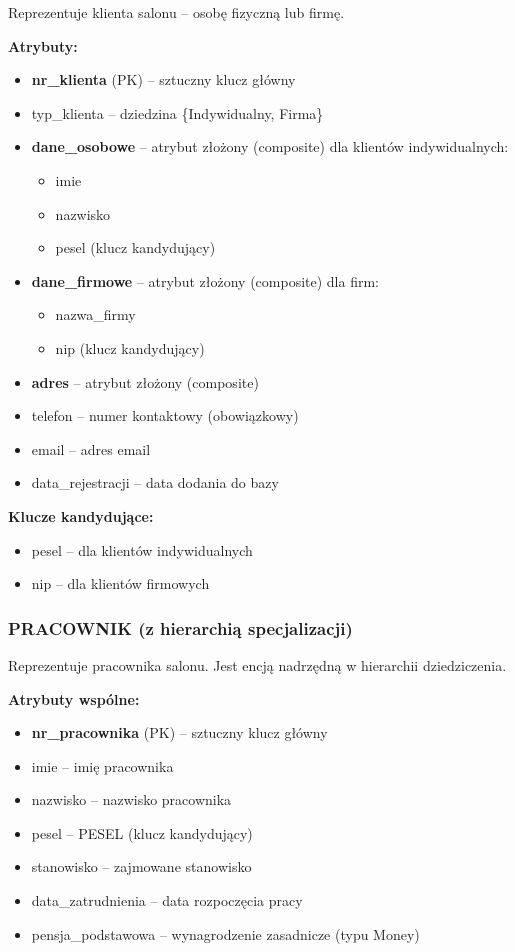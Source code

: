 \documentclass[a4paper,titleauthor]{mwart}
\begin{document}
	Reprezentuje klienta salonu -- osobę fizyczną lub firmę.
	
	\textbf{Atrybuty:}
	\begin{itemize}
		\item \textbf{nr\_klienta} (PK) -- sztuczny klucz główny
		\item typ\_klienta -- dziedzina \{Indywidualny, Firma\}
		\item \textbf{dane\_osobowe} -- atrybut złożony (composite) dla klientów indywidualnych:
		\begin{itemize}
			\item imie
			\item nazwisko
			\item pesel (klucz kandydujący)
		\end{itemize}
		\item \textbf{dane\_firmowe} -- atrybut złożony (composite) dla firm:
		\begin{itemize}
			\item nazwa\_firmy
			\item nip (klucz kandydujący)
		\end{itemize}
		\item \textbf{adres} -- atrybut złożony (composite)
		\item telefon -- numer kontaktowy (obowiązkowy)
		\item email -- adres email
		\item data\_rejestracji -- data dodania do bazy
	\end{itemize}
	
	\textbf{Klucze kandydujące:}
	\begin{itemize}
		\item pesel -- dla klientów indywidualnych
		\item nip -- dla klientów firmowych
	\end{itemize}
	
	\subsubsection{PRACOWNIK (z hierarchią specjalizacji)}
	
	Reprezentuje pracownika salonu. Jest encją nadrzędną w hierarchii dziedziczenia.
	
	\textbf{Atrybuty wspólne:}
	\begin{itemize}
		\item \textbf{nr\_pracownika} (PK) -- sztuczny klucz główny
		\item imie -- imię pracownika
		\item nazwisko -- nazwisko pracownika
		\item pesel -- PESEL (klucz kandydujący)
		\item stanowisko -- zajmowane stanowisko
		\item data\_zatrudnienia -- data rozpoczęcia pracy
		\item pensja\_podstawowa -- wynagrodzenie zasadnicze (typu Money)
	\end{itemize}
	
\end{document}
